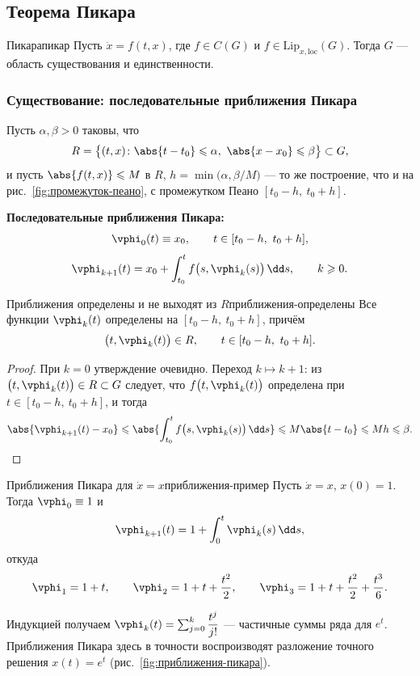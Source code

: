 \subsection{Теорема Пикара}\label{sec:пикар}

\begin{Theorem}{Пикара}{пикар}
	Пусть $\dot x = f(t,x)$, где $f \in C(G)$ и
	$f \in \mathrm{Lip}_{x,\mathrm{loc}}(G)$. Тогда $G$ --- область
	существования и единственности.
\end{Theorem}

\subsubsection*{Существование: последовательные приближения Пикара}

Пусть $\alpha, \beta > 0$ таковы, что
\[
R = \bigl\{(t,x) \colon \abs{t - t_0} \leqslant \alpha,\
\abs{x - x_0} \leqslant \beta\bigr\} \subset G,
\]
и пусть $\abs{f(t,x)} \leqslant M$ в $R$, $h = \min\bigl(\alpha, \beta/M\bigr)$ ---
то же построение, что и на рис.~\ref{fig:промежуток-пеано}, с промежутком
Пеано $[t_0-h,\ t_0+h]$.

\textbf{Последовательные приближения Пикара:}
\[
\vphi_0(t) \equiv x_0, \qquad t \in [t_0-h,\ t_0+h],
\]
\[
\vphi_{k+1}(t) = x_0 + \int_{t_0}^{t} f\bigl(s, \vphi_k(s)\bigr)\,\dd s,
\qquad k \geqslant 0.
\]

\begin{Lemma}{Приближения определены и не выходят из $R$}{приближения-определены}
	Все функции $\vphi_k(t)$ определены на $[t_0-h,\ t_0+h]$, причём
	\[
	\bigl(t, \vphi_k(t)\bigr) \in R, \qquad t \in [t_0-h,\ t_0+h].
	\]
\end{Lemma}

\begin{proof}
	При $k = 0$ утверждение очевидно. Переход $k \mapsto k+1$: из
	$\bigl(t, \vphi_k(t)\bigr) \in R \subset G$ следует, что $f\bigl(t, \vphi_k(t)\bigr)$
	определена при $t \in [t_0-h,\ t_0+h]$, и тогда
	\[
	\abs{\vphi_{k+1}(t) - x_0}
	\leqslant \abs{\int_{t_0}^{t} f\bigl(s, \vphi_k(s)\bigr)\,\dd s}
	\leqslant M\abs{t - t_0} \leqslant Mh \leqslant \beta.
	\]
\end{proof}

\begin{Example}[addon]{Приближения Пикара для $\dot x = x$}{приближения-пример}
	Пусть $\dot x = x$, $x(0) = 1$. Тогда $\vphi_0 \equiv 1$ и
	\[
	\vphi_{k+1}(t) = 1 + \int_0^t \vphi_k(s)\,\dd s ,
	\]
	откуда
	\[
	\vphi_1 = 1 + t, \qquad
	\vphi_2 = 1 + t + \frac{t^2}{2}, \qquad
	\vphi_3 = 1 + t + \frac{t^2}{2} + \frac{t^3}{6} .
	\]

	\medskip
	Индукцией получаем $\vphi_k(t) = \sum_{j=0}^{k} \dfrac{t^j}{j!}$ --- частичные
	суммы ряда для $e^t$. Приближения Пикара здесь в точности воспроизводят
	разложение точного решения $x(t) = e^t$ (рис.~\ref{fig:приближения-пикара}).
\end{Example}

